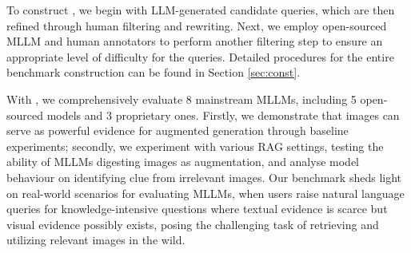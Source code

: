 To construct \dsns, we begin with LLM-generated candidate queries, which are then refined through human filtering and rewriting. Next, we employ open-sourced MLLM and human annotators to perform another filtering step to ensure an appropriate level of difficulty for the queries. Detailed procedures for the entire benchmark construction can be found in Section \ref{sec:const}. 




With \dsns, we comprehensively evaluate 8 mainstream MLLMs, including 5 open-sourced models and 3 proprietary ones. Firstly, we demonstrate that images can serve as powerful evidence for augmented generation through baseline experiments; secondly, we experiment with various RAG settings, testing the ability of MLLMs digesting images as augmentation, and analyse model behaviour on identifying clue from irrelevant images. Our benchmark sheds light on real-world scenarios for evaluating MLLMs, when users raise natural language queries for knowledge-intensive questions where textual evidence is scarce but visual evidence possibly exists, posing the challenging task of retrieving and utilizing relevant images in the wild.


